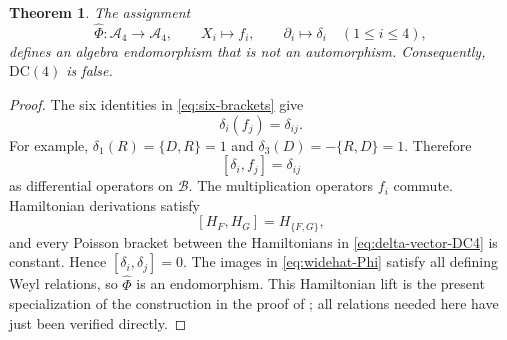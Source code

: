 \documentclass[11pt]{article}
\newcommand{\Bcal}{\mathcal B}
\newcommand{\Weyl}{\mathcal A}
\newcommand{\DC}{\mathrm{DC}}
\newtheorem{theorem}{Theorem}[section]
\theoremstyle{remark}
\begin{document}
\begin{theorem}\label{thm:explicit-DC4}
The assignment
\begin{equation}\label{eq:widehat-Phi}
  \widehat\Phi:\Weyl_4\longrightarrow\Weyl_4,
  \qquad
  X_i\longmapsto f_i,
  \qquad
  \partial_i\longmapsto\delta_i
  \quad(1\leq i\leq4),
\end{equation}
defines an algebra endomorphism that is not an automorphism.  Consequently,
\(\DC(4)\) is false.
\end{theorem}

\begin{proof}
The six identities in \eqref{eq:six-brackets} give
\begin{equation}\label{eq:delta-fi}
  \delta_i(f_j)=\delta_{ij}.
\end{equation}
For example,
\(
  \delta_1(R)=\{D,R\}=1
\)
and
\(
  \delta_3(D)=-\{R,D\}=1
\).
Therefore
\[
  [\delta_i,f_j]=\delta_{ij}
\]
as differential operators on \(\Bcal\).  The multiplication operators
\(f_i\) commute.  Hamiltonian derivations satisfy
\begin{equation}\label{eq:Hamiltonian-commutator}
  [H_F,H_G]=H_{\{F,G\}},
\end{equation}
and every Poisson bracket between the Hamiltonians in
\eqref{eq:delta-vector-DC4} is constant.  Hence
\([\delta_i,\delta_j]=0\).  The images in \eqref{eq:widehat-Phi} satisfy all
defining Weyl relations, so \(\widehat\Phi\) is an endomorphism.  This
Hamiltonian lift is the present specialization of the construction in the
proof of \cite[Theorem~7(2), equation~(5)]{Bavula}; all relations needed here
have just been verified directly.


\end{proof}
\end{document}
